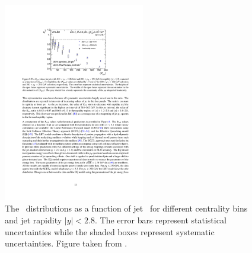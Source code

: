 \begin{figure}[htbp]
\begin{center}
\includegraphics[width=0.55\textwidth]{figures/jetMeasurements/raa_centDep}
\caption{The \RAA\ distributions as a function of jet \pt\ for different centrality bins and jet rapidity $|y| < 2.8$.
The error bars represent statistical uncertainties while the shaded boxes represent systematic uncertainties.
Figure taken from \cite{2019108}.}
\label{fig:raa_centDep}
\end{center}
\end{figure}




